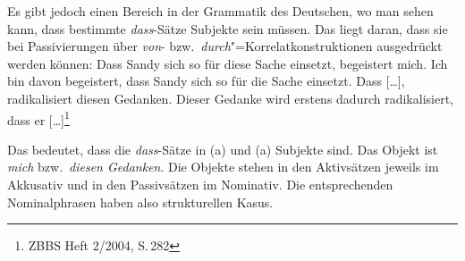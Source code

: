 Es gibt jedoch einen Bereich in der Grammatik des Deutschen, wo man sehen kann, dass bestimmte
\emph{dass}-Sätze Subjekte sein müssen. Das liegt daran, dass sie bei Passivierungen über
\emph{von}- bzw.\ \emph{durch}"=Korrelatkonstruktionen ausgedrückt werden können: 
\eal
\ex
\label{ex-Dass Sandy sich so für diese Sache einsetzt, begeistert mich}%
Dass Sandy sich so für diese Sache einsetzt, begeistert mich.
\ex Ich bin davon begeistert, dass Sandy sich so für die Sache einsetzt.
\zl
\eal
\ex Dass [\ldots], radikalisiert diesen Gedanken.
\ex Dieser Gedanke wird erstens dadurch radikalisiert, dass er [\ldots]\footnote{
ZBBS Heft 2/2004, S.\,282
}
\zl
\largerpage

\noindent
Das bedeutet, dass die \emph{dass}-Sätze in (a) und (a) Subjekte sind. Das Objekt ist
\emph{mich} bzw.\ \emph{diesen Gedanken}. Die Objekte stehen in den Aktivsätzen jeweils im Akkusativ
und in den Passivsätzen im Nominativ. Die entsprechenden Nominalphrasen haben also strukturellen Kasus.

